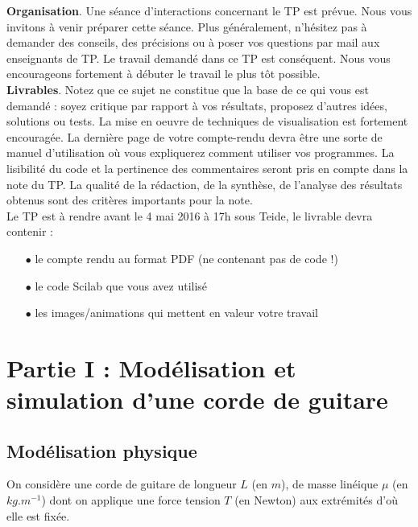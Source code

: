 \documentclass[a4,12pt]{article}
\begin{document}
\textbf{Organisation}. Une séance d'interactions concernant le TP est prévue. Nous vous invitons à venir préparer cette séance. Plus généralement, n'hésitez pas à demander des conseils, des précisions ou à poser vos questions par mail aux enseignants de TP. Le travail demandé dans ce TP est conséquent. Nous vous encourageons fortement à débuter le travail le plus tôt possible.\\

\textbf{Livrables}. Notez que ce sujet ne constitue que la base de ce qui vous est demandé : soyez critique par rapport à vos résultats, proposez d'autres idées, solutions ou tests. La mise en oeuvre de techniques de visualisation est fortement encouragée. La dernière page de votre compte-rendu devra être une sorte de manuel d'utilisation où vous expliquerez comment utiliser vos programmes. 
La lisibilité du code et la pertinence des commentaires seront pris en compte dans la note du TP. La qualité de la rédaction, de la synthèse, de l'analyse des résultats obtenus sont des critères importants pour la note. \\
Le TP est à rendre avant le 4 mai 2016 à 17h sous Teide, le livrable devra contenir : 
\begin{itemize}
	\item[$\bullet$] le compte rendu au format PDF (ne contenant pas de code !) 
	\item[$\bullet$] le code Scilab que vous avez utilisé 
	\item[$\bullet$] les images/animations qui mettent en valeur votre travail
\end{itemize}

 \newpage


\section*{Partie I : Modélisation et simulation d'une corde de guitare}

\subsection{Modélisation physique}

On considère une corde de guitare de longueur $L$ (en $m$), de masse linéique $\mu$ (en $kg.m^{-1}$) dont on applique une force tension $T$ (en Newton) aux extrémités d'où elle est fixée. \\
\end{document}
